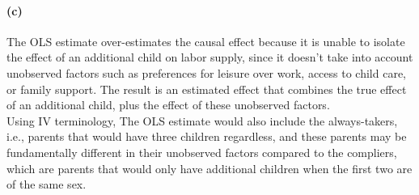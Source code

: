 \documentclass{scrartcl}
\begin{document}
\paragraph*{(c)}


The OLS estimate over-estimates the causal effect because it is unable to isolate the effect of an additional child on labor supply, since it doesn't take into account unobserved factors such as preferences for leisure over work, access to child care, or family support. The result is an estimated effect that combines the true effect of an additional child, plus the effect of these unobserved factors. \\
Using IV terminology, The OLS estimate would also include the always-takers, i.e., parents that would have three children regardless, and these parents may be fundamentally different in their unobserved factors compared to the compliers, which are parents that would only have additional children when the first two are of the same sex.
\end{document}
